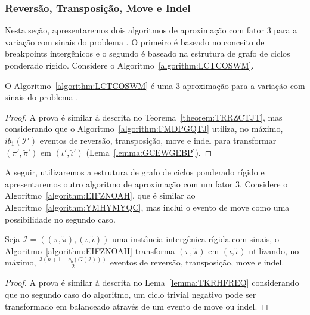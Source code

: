 \subsubsection{Reversão, Transposição, Move e Indel}

Nesta seção, apresentaremos dois algoritmos de aproximação com fator $3$ para a variação com sinais do problema \SbIRTMI{}. O primeiro é baseado no conceito de breakpoints intergênicos e o segundo é baseado na estrutura de grafo de ciclos ponderado rígido. Considere o Algoritmo~\ref{algorithm:LCTCOSWM}.



\begin{theorem}\label{theorem:KKKBVPAY}
O Algoritmo~\ref{algorithm:LCTCOSWM} é uma $3$-aproximação para a variação com sinais do problema \SbIRTMI{}.
\end{theorem}
\begin{proof}
A prova é similar à descrita no Teorema~\ref{theorem:TRRZCTJT}, mas considerando que o Algoritmo~\ref{algorithm:FMDPGQTJ} utiliza, no máximo, $ib_1(\mathcal{I'})$ eventos de reversão, transposição, move e indel para transformar $(\pi',\breve\pi')$ em $(\iota',\breve\iota')$ (Lema~\ref{lemma:GCEWGEBP}).
\end{proof}

A seguir, utilizaremos a estrutura de grafo de ciclos ponderado rígido e apresentaremos outro algoritmo de aproximação com um fator $3$. Considere o Algoritmo~\ref{algorithm:EIFZNOAH}, que é similar ao Algoritmo~\ref{algorithm:YMHYMYQC}, mas inclui o evento de move como uma possibilidade no segundo caso.



\begin{lemma}\label{lemma:TEVTTPGB}
Seja $\mathcal{I} = ((\pi,\breve\pi),(\iota,\breve\iota))$ uma instância intergênica rígida com sinais, o Algoritmo~\ref{algorithm:EIFZNOAH} transforma $(\pi,\breve\pi)$ em $(\iota,\breve\iota)$ utilizando, no máximo, $\frac{3(n+1 - c_b(G(\mathcal{I})))}{2}$ eventos de reversão, transposição, move e indel.
\end{lemma}
\begin{proof}
A prova é similar à descrita no Lema~\ref{lemma:TKRHFREQ} considerando que no segundo caso do algoritmo, um ciclo trivial negativo pode ser transformado em balanceado através de um evento de move ou indel.
\end{proof}

